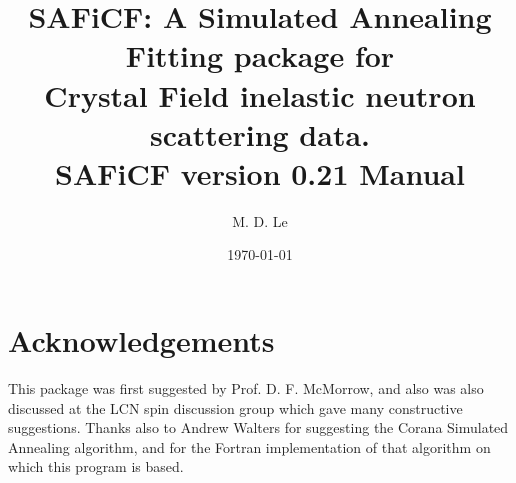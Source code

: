 \documentclass[12pt,onecolumn,tightenlines,aps,amsmath,floatfix,notitlepage,nofootinbib]{revtex4}
\begin{document}
\title{SAFiCF: A Simulated Annealing Fitting package for \\ Crystal Field inelastic neutron scattering data. \\ SAFiCF version 0.21 Manual}

\author{M. D. Le}

{}

\date{\today}






\maketitle

\tableofcontents                %

\section*{Acknowledgements} \label{sec-acknowledgements}

This package was first suggested by Prof. D. F. McMorrow, and also was also discussed at the LCN spin discussion group which gave many constructive suggestions. Thanks also to Andrew Walters for suggesting the Corana Simulated Annealing algorithm, and for the Fortran implementation of that algorithm on which this program is based. 

\newpage
\end{document}
